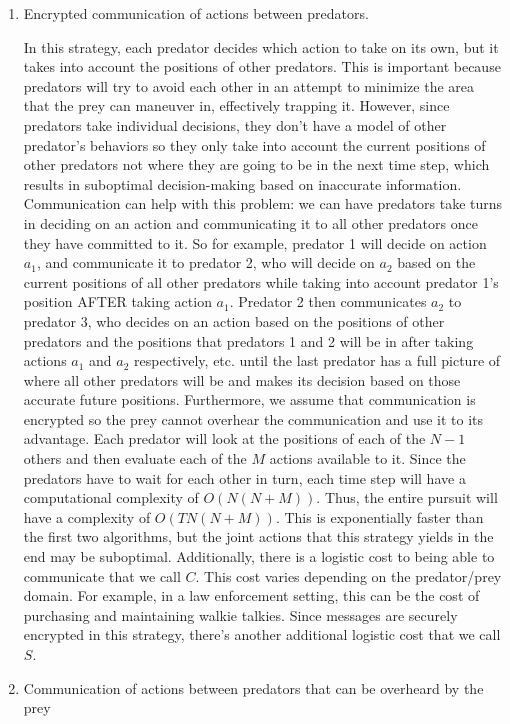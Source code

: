 \documentclass[11pt]{article}
\begin{document}
\begin{multicols}{2}
\begin{enumerate}[leftmargin=0.25cm]
	\item Encrypted communication of actions between predators.
	
	In this strategy, each predator decides which action to take on its own, but it takes into account the positions of other predators. This is important because predators will try to avoid each other in an attempt to minimize the area that the prey can maneuver in, effectively trapping it. However, since predators take individual decisions, they don't have a model of other predator's behaviors so they only take into account the current positions of other predators not where they are going to be in the next time step, which results in suboptimal decision-making based on inaccurate information. Communication can help with this problem: we can have predators take turns in deciding on an action and communicating it to all other predators once they have committed to it. So for example, predator 1 will decide on action $a_1$, and communicate it to predator 2, who will decide on $a_2$ based on the current positions of all other predators while taking into account predator 1's position AFTER taking action $a_1$. Predator 2 then communicates $a_2$ to predator 3, who decides on an action based on the positions of other predators and the positions that predators 1 and 2 will be in after taking actions $a_1$ and $a_2$ respectively, etc. until the last predator has a full picture of where all other predators will be and makes its decision based on those accurate future positions. Furthermore, we assume that communication is encrypted so the prey cannot overhear the communication and use it to its advantage. Each predator will look at the positions of each of the $N-1$ others and then evaluate each of the $M$ actions available to it. Since the predators have to wait for each other in turn, each time step will have a computational complexity of $O(N(N+M))$. Thus, the entire pursuit will have a complexity of $O(TN(N+M))$. This is exponentially faster than the first two algorithms, but the joint actions that this strategy yields in the end may be suboptimal. Additionally, there is a logistic cost to being able to communicate that we call $C$. This cost varies depending on the predator/prey domain. For example, in a law enforcement setting, this can be the cost of purchasing and maintaining walkie talkies. Since messages are securely encrypted in this strategy, there's another additional logistic cost that we call $S$. 
	
	\item Communication of actions between predators that can be overheard by the prey
	

\end{enumerate}
\end{multicols}
\end{document}
